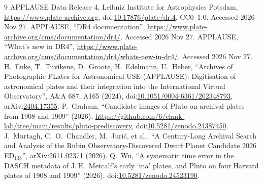 \documentclass[11pt]{article}
\begin{document}
\begin{thebibliography}{9}
 APPLAUSE Data Release 4, Leibniz Institute for Astrophysics Potsdam, \url{https://www.plate-archive.org}, doi:\href{https://doi.org/10.17876/plate/dr.4}{10.17876/plate/dr.4}. CC0~1.0. Accessed 2026 Nov 27.
 APPLAUSE, ``DR4 documentation'', \url{https://www.plate-archive.org/cms/documentation/dr4/}. Accessed 2026 Nov 27.
 APPLAUSE, ``What's new in DR4'', \url{https://www.plate-archive.org/cms/documentation/dr4/whats-new-in-dr4/}. Accessed 2026 Nov 27.
 H.~Enke, T.~Tuvikene, D.~Groote, H.~Edelmann, U.~Heber, ``Archives of Photographic PLates for Astronomical USE (APPLAUSE): Digitisation of astronomical plates and their integration into the International Virtual Observatory'', A\&A 687, A165 (2024), doi:\href{https://doi.org/10.1051/0004-6361/202348793}{10.1051/0004-6361/202348793}, arXiv:\href{https://arxiv.org/abs/2404.17355}{2404.17355}.
 P.~Graham, ``Candidate images of Pluto on archival plates from 1908 and 1909'' (2026), \url{https://github.com/6/clank-lab/tree/main/results/pluto-prediscovery}, doi:\href{https://doi.org/10.5281/zenodo.24387450}{10.5281/zenodo.24387450}.
 J.~Murtagh, C.~O.~Chandler, M.~Juri\'c, et al., ``A Century-Long Archival Search and Analysis of the Rubin Observatory-Discovered Dwarf Planet Candidate 2026 ED$_{138}$'', arXiv:\href{https://arxiv.org/abs/2611.02371}{2611.02371} (2026).
 Q.~Wu, ``A systematic time error in the DASCH metadata of J.\,H.~Metcalf's early `ma' plates, and Pluto on four Harvard plates of 1908 and 1909'' (2026), doi:\href{https://doi.org/10.5281/zenodo.24523190}{10.5281/zenodo.24523190}.
\end{thebibliography}
\end{document}
